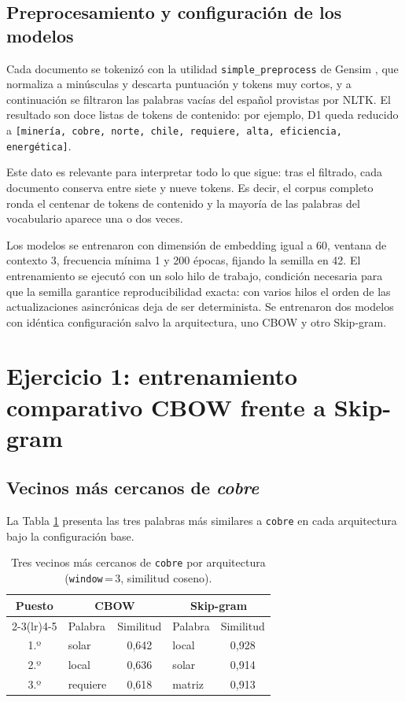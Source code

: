 \documentclass[12pt, a4paper]{article}
\newcommand{\code}[1]{\texttt{#1}}
\begin{document}
\subsection{Preprocesamiento y configuración de los modelos}

Cada documento se tokenizó con la utilidad \code{simple\_preprocess} de Gensim
\citep{rehurek2010software}, que normaliza a minúsculas y descarta puntuación y tokens muy cortos, y
a continuación se filtraron las palabras vacías del español provistas por NLTK. El resultado son
doce listas de tokens de contenido: por ejemplo, D1 queda reducido a
\code{[minería, cobre, norte, chile, requiere, alta, eficiencia, energética]}.

Este dato es relevante para interpretar todo lo que sigue: tras el filtrado, cada documento conserva
entre siete y nueve tokens. Es decir, el corpus completo ronda el centenar de tokens de contenido y
la mayoría de las palabras del vocabulario aparece una o dos veces.

Los modelos se entrenaron con dimensión de embedding igual a 60, ventana de contexto 3, frecuencia
mínima 1 y 200 épocas, fijando la semilla en 42. El entrenamiento se ejecutó con un solo hilo de
trabajo, condición necesaria para que la semilla garantice reproducibilidad exacta: con varios hilos
el orden de las actualizaciones asincrónicas deja de ser determinista. Se entrenaron dos modelos con
idéntica configuración salvo la arquitectura, uno CBOW y otro Skip-gram.

\section{Ejercicio 1: entrenamiento comparativo CBOW frente a Skip-gram}

\subsection{Vecinos más cercanos de \textit{cobre}}

La Tabla \ref{tab:e1} presenta las tres palabras más similares a \code{cobre} en cada arquitectura
bajo la configuración base.

\begin{table}[H]
\centering
\caption{Tres vecinos más cercanos de \code{cobre} por arquitectura (\code{window}\,=\,3, similitud coseno).}
\label{tab:e1}
\small
\renewcommand{\arraystretch}{1.2}
\begin{tabular}{@{}clc lc@{}}
\toprule
\textbf{Puesto} & \multicolumn{2}{c}{\textbf{CBOW}} & \multicolumn{2}{c}{\textbf{Skip-gram}} \\
\cmidrule(lr){2-3}\cmidrule(lr){4-5}
 & Palabra & Similitud & Palabra & Similitud \\
\midrule
1.º & solar    & 0,642 & local  & 0,928 \\
2.º & local    & 0,636 & solar  & 0,914 \\
3.º & requiere & 0,618 & matriz & 0,913 \\
\bottomrule
\end{tabular}
\end{table}
\end{document}

